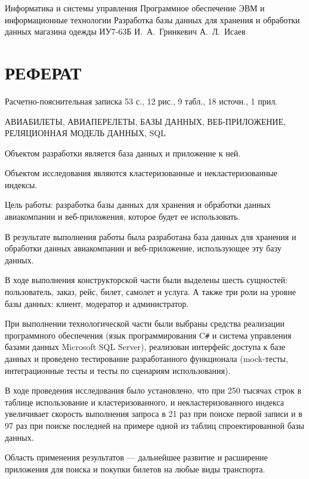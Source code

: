 \documentclass{bmstu}
\begin{document}
\makecourseworktitle
    {Информатика и системы управления}
    {Программное обеспечение ЭВМ и информационные технологии}
    {Разработка базы данных для хранения и обработки данных магазина одежды}
    {ИУ7-63Б}
    {И.~А.~Гринкевич}
    {А.~Л.~Исаев}
    {}
    {}
    
\setcounter{page}{3}

{\centering \chapter*{РЕФЕРАТ}}

Расчетно-пояснительная записка 53 с., 12 рис., 9 табл., 18 источн., 1 прил.

\noindent АВИАБИЛЕТЫ, АВИАПЕРЕЛЕТЫ, БАЗЫ ДАННЫХ, ВЕБ-ПРИЛОЖЕНИЕ, РЕЛЯЦИОННАЯ МОДЕЛЬ ДАННЫХ, SQL

Объектом разработки является база данных и приложение к ней.

Объектом исследования являются кластеризованные и некластеризованные индексы.

Цель работы: разработка базы данных для хранения и обработки данных авиакомпании и веб-приложения, которое будет ее использовать.

В результате выполнения работы была разработана база данных для хранения и обработки данных авиакомпании и веб-приложение, использующее эту базу данных.

В ходе выполнения конструкторской части были выделены шесть сущностей: пользователь, заказ, рейс, билет, самолет и услуга. 
А также три роли на уровне базы данных: клиент, модератор и администратор.

При выполнении технологической части были выбраны средства реализации программного обеспечения (язык программирования C\texttt{\#} и система управления базами данных Microsoft SQL Server), реализован интерфейс доступа к базе данных и проведено тестирование разработанного функционала (mock-тесты, интеграционные тесты и тесты по сценариям использования).

В ходе проведения исследования было установлено, что при 250 тысячах строк в таблице использование и кластеризованного, и некластеризованного индекса увеличивает скорость выполнения запроса в 21 раз при поиске первой записи и в 97 раз при поиске последней на примере одной из таблиц спроектированной базы данных.

Область применения результатов --- дальнейшее развитие и расширение приложения для поиска и покупки билетов на любые виды транспорта.
\end{document}
